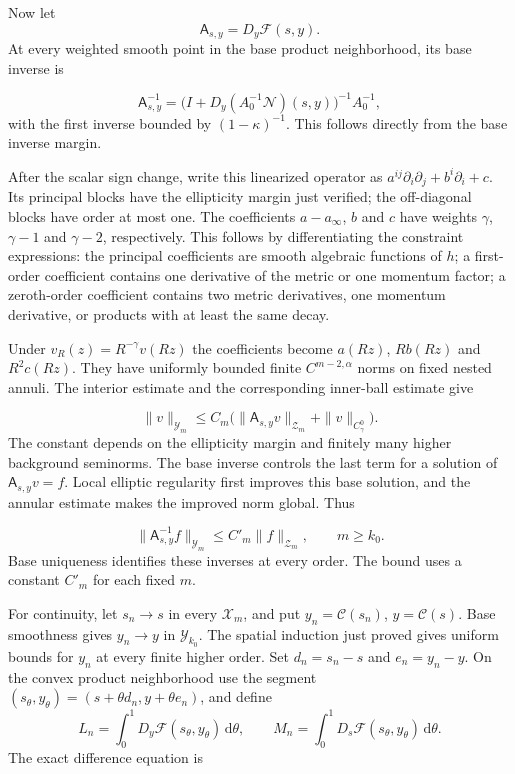 \documentclass[
  english,
  11pt,
  reqno]{amsart}
\begin{document}
Now let \[
\mathsf A_{s,y}=D_y\mathcal F(s,y).
\] At every weighted smooth point in the base product neighborhood, its
base inverse is

\label{eq:online-chart-base-transverse-inverse} \[
\mathsf A_{s,y}^{-1}
=\bigl(I+D_y(A_0^{-1}\mathcal N)(s,y)\bigr)^{-1}A_0^{-1},
\] with the first inverse bounded by \((1-\kappa)^{-1}\). This follows
directly from the base inverse margin.

After the scalar sign change, write this linearized operator as
\(a^{ij}\partial_i\partial_j+b^i\partial_i+c\). Its principal blocks
have the ellipticity margin just verified; the off-diagonal blocks have
order at most one. The coefficients \(a-a_\infty\), \(b\) and \(c\) have
weights \(\gamma\), \(\gamma-1\) and \(\gamma-2\), respectively. This
follows by differentiating the constraint expressions: the principal
coefficients are smooth algebraic functions of \(h\); a first-order
coefficient contains one derivative of the metric or one momentum
factor; a zeroth-order coefficient contains two metric derivatives, one
momentum derivative, or products with at least the same decay.

Under \(v_R(z)=R^{-\gamma}v(Rz)\) the coefficients become \(a(Rz)\),
\(Rb(Rz)\) and \(R^2c(Rz)\). They have uniformly bounded finite
\(C^{m-2,\alpha}\) norms on fixed nested annuli. The interior estimate
and the corresponding inner-ball estimate give

\label{eq:online-chart-transverse-weighted-estimate} \[
\|v\|_{\mathcal Y_m}
\le C_m\bigl(\|\mathsf A_{s,y}v\|_{\mathcal Z_m}
+\|v\|_{C^0_\gamma}\bigr).
\] The constant depends on the ellipticity margin and finitely many
higher background seminorms. The base inverse controls the last term for
a solution of \(\mathsf A_{s,y}v=f\). Local elliptic regularity first
improves this base solution, and the annular estimate makes the improved
norm global. Thus

\label{eq:online-chart-transverse-all-order-inverse} \[
\|\mathsf A_{s,y}^{-1}f\|_{\mathcal Y_m}
\le C'_m\|f\|_{\mathcal Z_m},
\qquad m\ge k_0.
\] Base uniqueness identifies these inverses at every order. The bound
uses a constant \(C'_m\) for each fixed \(m\).

For continuity, let \(s_n\to s\) in every \(\mathcal X_m\), and put
\(y_n=\mathcal C(s_n)\), \(y=\mathcal C(s)\). Base smoothness gives
\(y_n\to y\) in \(\mathcal Y_{k_0}\). The spatial induction just proved
gives uniform bounds for \(y_n\) at every finite higher order. Set
\(d_n=s_n-s\) and \(e_n=y_n-y\). On the convex product neighborhood use
the segment \((s_\theta,y_\theta)=(s+\theta d_n,y+\theta e_n)\), and
define \[
L_n=\int_0^1D_y\mathcal F(s_\theta,y_\theta)\,\mathrm d\theta,
\qquad
M_n=\int_0^1D_s\mathcal F(s_\theta,y_\theta)\,\mathrm d\theta.
\] The exact difference equation is
\end{document}
